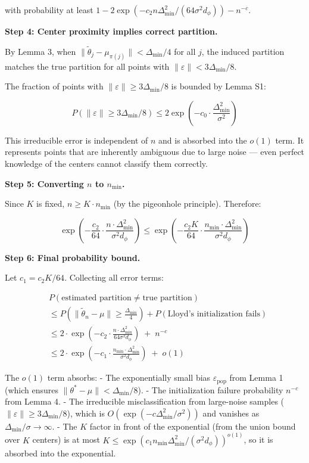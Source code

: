 \documentclass[
  12pt,
]{ctexart}
\begin{document}
with probability at least
\(1 - 2\exp(-c_2 n \Delta_{\min}^2 / (64 \sigma^2 d_\phi)) - n^{-c}\).

\textbf{Step 4: Center proximity implies correct partition.}

By Lemma 3, when
\(\|\tilde{\theta}_j - \mu_{\pi(j)}\| < \Delta_{\min}/4\) for all \(j\),
the induced partition matches the true partition for all points with
\(\|\varepsilon\| < 3\Delta_{\min}/8\).

The fraction of points with \(\|\varepsilon\| \geq 3\Delta_{\min}/8\) is
bounded by Lemma S1:

\[P(\|\varepsilon\| \geq 3\Delta_{\min}/8) \leq 2 \exp\left(-c_0 \cdot \frac{\Delta_{\min}^2}{\sigma^2}\right)\]

This irreducible error is independent of \(n\) and is absorbed into the
\(o(1)\) term. It represents points that are inherently ambiguous due to
large noise --- even perfect knowledge of the centers cannot classify
them correctly.

\textbf{Step 5: Converting \(n\) to \(n_{\min}\).}

Since \(K\) is fixed, \(n \geq K \cdot n_{\min}\) (by the pigeonhole
principle). Therefore:

\[\exp\left(-\frac{c_2}{64} \cdot \frac{n \cdot \Delta_{\min}^2}{\sigma^2 d_\phi}\right) \leq \exp\left(-\frac{c_2 K}{64} \cdot \frac{n_{\min} \cdot \Delta_{\min}^2}{\sigma^2 d_\phi}\right)\]

\textbf{Step 6: Final probability bound.}

Let \(c_1 = c_2 K / 64\). Collecting all error terms:

\[\begin{aligned}
&P(\text{estimated partition} \neq \text{true partition}) \\
&\leq P\left(\|\tilde{\theta}_n - \mu\| \geq \frac{\Delta_{\min}}{4}\right) + P(\text{Lloyd's initialization fails}) \\
&\leq 2 \cdot \exp\left(-c_2 \cdot \frac{n \cdot \Delta_{\min}^2}{64 \sigma^2 d_\phi}\right) \;+\; n^{-c} \\
&\leq 2 \cdot \exp\left(-c_1 \cdot \frac{n_{\min} \cdot \Delta_{\min}^2}{\sigma^2 d_\phi}\right) \;+\; o(1)
\end{aligned}\]

The \(o(1)\) term absorbs: - The exponentially small bias
\(\varepsilon_{\text{pop}}\) from Lemma 1 (which ensures
\(\|\theta^* - \mu\| < \Delta_{\min}/8\)). - The initialization failure
probability \(n^{-c}\) from Lemma 4. - The irreducible misclassification
from large-noise samples (\(\|\varepsilon\| \geq 3\Delta_{\min}/8\)),
which is \(O(\exp(-c \Delta_{\min}^2/\sigma^2))\) and vanishes as
\(\Delta_{\min}/\sigma \to \infty\). - The \(K\) factor in front of the
exponential (from the union bound over \(K\) centers) is at most
\(K \leq \exp(c_1 n_{\min} \Delta_{\min}^2 / (\sigma^2 d_\phi))^{o(1)}\),
so it is absorbed into the exponential.
\end{document}
